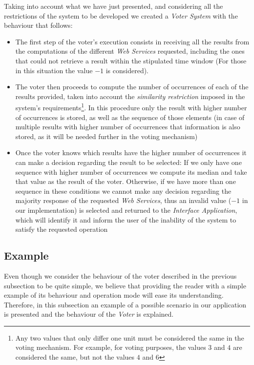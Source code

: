 Taking into account what we have just presented, and considering all the restrictions of the system to be developed we created a \emph{Voter System} with the behaviour that follows:

\begin{itemize}
\item The first step of the voter's execution consists in receiving all the results from the computations of the different \emph{Web Services} requested, including the ones that could not retrieve a result within the stipulated time window (For those in this situation the value $-1$ is considered).

\item The voter then proceeds to compute the number of occurrences of each of the results provided, taken into account the \emph{similarity restriction} imposed in the system's requirements\footnote{Any two values that only differ one unit must be considered the same in the voting mechanism. For example, for voting purposes, the values $3$ and $4$ are considered the same, but not the values $4$ and $6$}. In this procedure only the result with higher number of occurrences is stored, as well as the sequence of those elements (in case of multiple results with higher number of occurrences that information is also stored, as it will be needed further in the voting mechanism)

\item Once the voter knows which results have the higher number of occurrences it can make a decision regarding the result to be selected: If we only have one sequence with higher number of occurrences we compute its median and take that value as the result of the voter. Otherwise, if we have more than one sequence in these conditions we cannot make any decision regarding the majority response of the requested \emph{Web Services}, thus an invalid value ($-1$ in our implementation) is selected and returned to the \emph{Interface Application}, which will identify it and inform the user of the inability of the system to satisfy the requested operation
\end{itemize}

\subsection{Example}

Even though we consider the behaviour of the voter described in the previous subsection to be quite simple, we believe that providing the reader with a simple example of its behaviour and operation mode will ease its understanding. Therefore, in this subsection an example of a possible scenario in our application is presented and the behaviour of the \emph{Voter} is explained.

